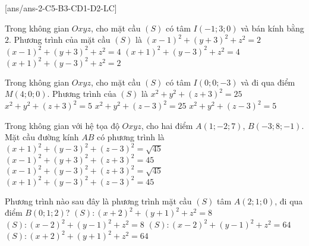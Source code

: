 \TN
{}[ans/ans-2-C5-B3-CD1-D2-LC]
\begin{ex}%
Trong không gian $Oxyz$, cho mặt cầu $(S)$ có tâm $I(-1;3;0)$ và bán kính bằng $2$. Phương trình của mặt cầu $(S)$ là
\choice
{$(x-1)^2+(y+3)^2+z^2=2$}
{$(x-1)^2+(y+3)^2+z^2=4$}
{\True $(x+1)^2+(y-3)^2+z^2=4$}
{$(x+1)^2+(y-3)^2+z^2=2$}
\end{ex}

\begin{ex}%
Trong không gian $Oxyz$, cho mặt cầu $(S)$ có tâm $I(0;0;-3)$ và đi qua điểm $M(4;0;0)$. Phương trình của $(S)$ là
\choice
{\True $x^2+y^2+(z+3)^2=25$}
{$x^2+y^2+(z+3)^2=5$}
{$x^2+y^2+(z-3)^2=25$}
{$x^2+y^2+(z-3)^2=5$}
\end{ex}

\begin{ex}%
Trong không gian với hệ tọa độ $Oxyz$, cho hai điểm $A(1;-2;7)$, $B(-3;8;-1)$. Mặt cầu đường kính $AB$ có phương trình là
\choice
{$(x+1)^2+(y-3)^2+(z-3)^2=\sqrt{45}$}
{$(x-1)^2+(y+3)^2+(z+3)^2=45$}
{$(x-1)^2+(y-3)^2+(z+3)^2=\sqrt{45}$}
{\True $(x+1)^2+(y-3)^2+(z-3)^2=45$}
\end{ex}

\begin{ex}%
Phương trình nào sau đây là phương trình mặt cầu $(S)$ tâm $A(2;1;0)$, đi qua điểm $B(0;1;2)$?
\choice
{$(S)\colon{(x+2)^2}+(y+1)^2+z^2=8$}
{\True $(S)\colon{(x-2)^2}+(y-1)^2+z^2=8$}
{$(S)\colon{(x-2)^2}+(y-1)^2+z^2=64$}
{$(S)\colon{(x+2)^2}+(y+1)^2+z^2=64$}
\end{ex}

